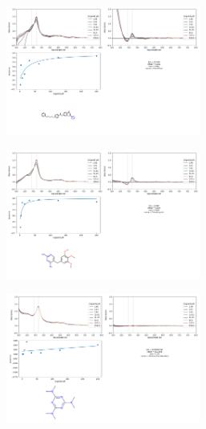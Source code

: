 \documentclass{article}
\begin{document}
\begin{centering}
\begin{figure}[H]
	\centering
	\caption{\label{goodplates} Pranlukast, Trimethoprim and Altretamine(Hexalen) screened against A82F/F87V, A82F/F87V and A82F respectively.}
	\begin{subfigure}{\linewidth}
		\includegraphics[width=0.7\textwidth]{figs/Pranlukast.png}
	\end{subfigure}
	\begin{subfigure}{\linewidth}
		\includegraphics[width=0.7\textwidth]{figs/Trimethoprim.png}
	\end{subfigure}
	\begin{subfigure}{\linewidth}
		\includegraphics[width=0.7\textwidth]{figs/Altretamine(Hexalen).png}
	\end{subfigure}
\end{figure}
\end{centering}
\end{document}
